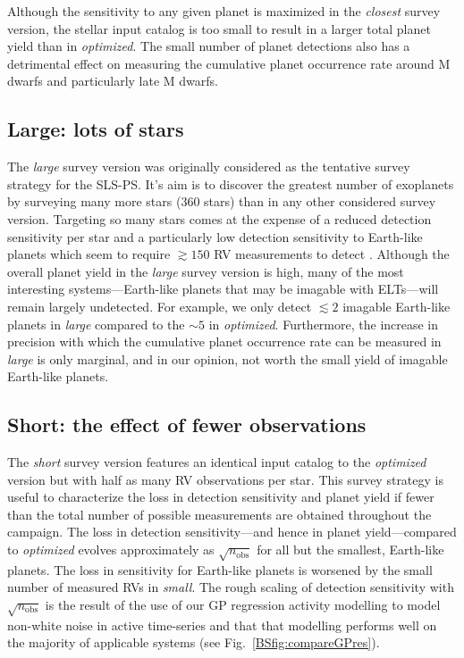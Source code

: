 Although the sensitivity to any given planet is maximized in the \emph{closest} survey version, the stellar
input catalog is too small to result in a larger total planet yield than in \emph{optimized}. The small number
of planet detections also has a detrimental effect on measuring the cumulative planet occurrence rate
around M dwarfs and particularly late M dwarfs.

\subsection{Large: lots of stars}
The \emph{large} survey version was originally considered as the tentative survey strategy for the SLS-PS.
It's aim is to discover the greatest number of exoplanets by surveying many more stars (360 stars) than
in any other considered survey version. Targeting so many stars comes at the expense of a reduced detection
sensitivity per star and a particularly low detection sensitivity to Earth-like planets which seem to require
$\gtrsim 150$ RV measurements to detect \citep[e.g.][]{astudillodefru17a}. Although the
overall planet yield in the \emph{large} survey version is high, many of the most interesting
systems---Earth-like planets that may be imagable with ELTs---will remain largely undetected. For example,
we only detect $\lesssim 2$ imagable Earth-like planets in \emph{large} compared to the $\sim 5$ in
\emph{optimized}. Furthermore, the
increase in precision with which the cumulative planet occurrence rate can be measured in \emph{large} is only
marginal, and in our opinion, not worth the small yield of imagable Earth-like planets.

\subsection{Short: the effect of fewer observations}
The \emph{short} survey version features an identical input catalog to the \emph{optimized} version but
with half as many RV observations per star. This survey strategy is useful to characterize the loss in detection  
sensitivity and planet yield if fewer than the total number of possible measurements are
obtained throughout the campaign. The loss in detection sensitivity---and hence in planet yield---compared to
\emph{optimized} evolves
approximately as $\sqrt{n_{\text{obs}}}$ for all but the smallest, Earth-like planets. The loss in sensitivity
for Earth-like planets is worsened by the small number of measured RVs in \emph{small}. The rough scaling of
detection sensitivity with $\sqrt{n_{\text{obs}}}$ is the result of the use of our GP regression activity modelling
to model non-white noise in active time-series and that that modelling performs well on the majority of applicable
systems (see Fig.~\ref{BSfig:compareGPres}).

